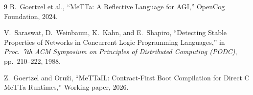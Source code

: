 \documentclass[11pt]{article}
\begin{document}

\begin{thebibliography}{9}
  B.~Goertzel et al.,
  ``MeTTa: A Reflective Language for AGI,''
  OpenCog Foundation, 2024.

  V.~Saraswat, D.~Weinbaum, K.~Kahn, and E.~Shapiro,
  ``Detecting Stable Properties of Networks in Concurrent Logic
  Programming Languages,''
  in \emph{Proc.\ 7th ACM Symposium on Principles of Distributed
  Computing (PODC)}, pp.~210--222, 1988.

  Z.~Goertzel and Oru\v{z}i,
  ``MeTTaIL: Contract-First Boot Compilation for Direct C MeTTa Runtimes,''
  Working paper, 2026.
\end{thebibliography}
\end{document}
